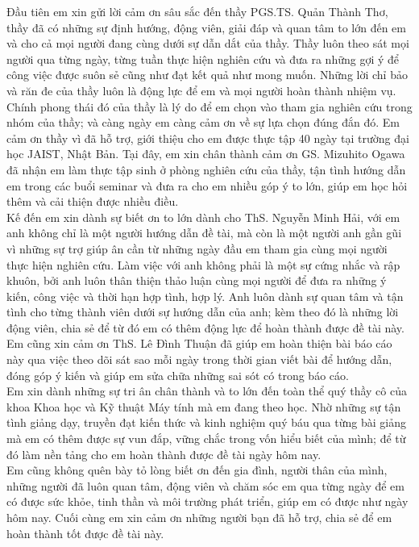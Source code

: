 Đầu tiên em xin gửi lời cảm ơn sâu sắc đến thầy PGS.TS. Quản Thành Thơ, thầy đã có những sự định hướng, động viên, giải đáp và quan tâm to lớn đến em và cho cả mọi người đang cùng dưới sự dẫn dắt của thầy. Thầy luôn theo sát mọi người qua từng ngày, từng tuần thực hiện nghiên cứu và đưa ra những gợi ý để công việc được suôn sẻ cũng như đạt kết quả như mong muốn. Những lời chỉ bảo và răn đe của thầy luôn là động lực để em và mọi người hoàn thành nhiệm vụ. Chính phong thái đó của thầy là lý do để em chọn vào tham gia nghiên cứu trong nhóm của thầy; và càng ngày em càng cảm ơn về sự lựa chọn đúng đắn đó. Em cảm ơn thầy vì đã hỗ trợ, giới thiệu cho em được thực tập 40 ngày tại trường đại học JAIST, Nhật Bản. Tại đây, em xin chân thành cảm ơn GS. Mizuhito Ogawa đã nhận em làm thực tập sinh ở phòng nghiên cứu của thầy, tận tình hướng dẫn em trong các buổi seminar và đưa ra cho em nhiều góp ý to lớn, giúp em học hỏi thêm và cải thiện được nhiều điều.\\

Kế đến em xin dành sự biết ơn to lớn dành cho ThS. Nguyễn Minh Hải, với em anh không chỉ là một người hướng dẫn đề tài, mà còn là một người anh gần gũi vì những sự trợ giúp ân cần từ những ngày đầu em tham gia cùng mọi người thực hiện nghiên cứu. Làm việc với anh không phải là một sự cứng nhắc và rập khuôn, bởi anh luôn thân thiện thảo luận cùng mọi người để đưa ra những ý kiến, công việc và thời hạn hợp tình, hợp lý. Anh luôn dành sự quan tâm và tận tình cho từng thành viên dưới sự hướng dẫn của anh; kèm theo đó là những lời động viên, chia sẻ để từ đó em có thêm động lực để hoàn thành được đề tài này.\\

Em cũng xin cảm ơn ThS. Lê Đình Thuận đã giúp em hoàn thiện bài báo cáo này qua việc theo dõi sát sao mỗi ngày trong thời gian viết bài để hướng dẫn, đóng góp ý kiến và giúp em sửa chữa những sai sót có trong báo cáo.\\

Em xin dành những sự tri ân chân thành và to lớn đến toàn thể quý thầy cô của khoa Khoa học và Kỹ thuật Máy tính mà em đang theo học. Nhờ những sự tận tình giảng dạy, truyền đạt kiến thức và kinh nghiệm quý báu qua từng bài giảng mà em có thêm được sự vun đắp, vững chắc trong vốn hiểu biết của mình; để từ đó làm nền tảng cho em hoàn thành được đề tài ngày hôm nay.\\

Em cũng không quên bày tỏ lòng biết ơn đến gia đình, người thân của mình, những người đã luôn quan tâm, động viên và chăm sóc em qua từng ngày để em có được sức khỏe, tinh thần và môi trường phát triển, giúp em có được như ngày hôm nay. Cuối cùng em xin cảm ơn những người bạn đã hỗ trợ, chia sẻ để em hoàn thành tốt được đề tài này.\\


